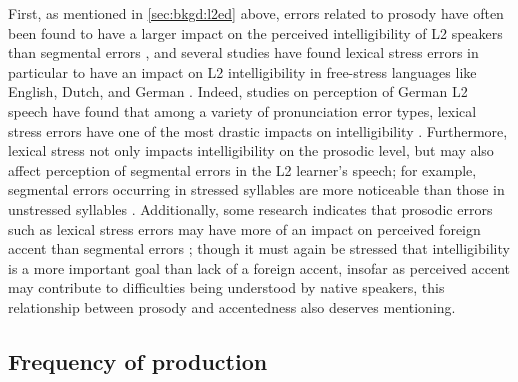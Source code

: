 	First, as mentioned in \cref{sec:bkgd:l2ed} above, errors related to prosody have 
	often
	 been found to have a larger impact on the perceived intelligibility of L2 speakers than segmental errors \citep{Hahn2004,Derwing2005,Witt2012}, and several studies have found lexical stress errors in particular to have an impact on L2 intelligibility
	 in free-stress languages like English, Dutch, and 
	 German \citep{Hirschfeld1994,Cutler2005,Field2005}.
	Indeed, studies on perception of German L2 speech have found that among a variety of pronunciation error types, lexical stress errors have one of the most drastic impacts on intelligibility \citep{Hirschfeld1994}.
%
		Furthermore, lexical stress not only impacts intelligibility on the prosodic level, but may also affect perception of segmental errors in the L2 learner's speech; for example, segmental errors occurring in stressed syllables are more noticeable than those in unstressed syllables \citep{Cutler2005,Michaux2012}. 
		Additionally, some research indicates that prosodic errors such as lexical stress errors may have more of an impact on perceived foreign accent than segmental errors \citep{Hahn2004,Witt2012}; though it must again be stressed that intelligibility is a more important goal than lack of a foreign accent, insofar as perceived accent may contribute to difficulties being understood by native speakers, this relationship between prosody and accentedness also deserves mentioning.

		\subsection{Frequency of production}
		\label{sec:targeting:frequency}

